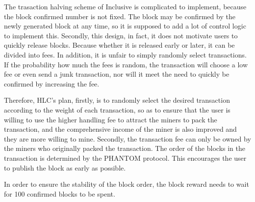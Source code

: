\documentclass[a4paper,11pt]{article}
\begin{document}
The trasaction halving scheme of Inclusive is complicated to implement, because the block confirmed number is not fixed. The block may be confirmed by the newly generated block at any time, so it is supposed to add a lot of control logic to implement this. Secondly, this design, in fact, it does not motivate users to quickly release blocks. Because whether it is released early or later, it can be divided into fees. In addition, it is unfair to simply randomly select transactions. If the probability how much the fees is random, the transaction will choose a low fee or even send a junk transaction, nor will it meet the need to quickly be confirmed by increasing the fee.

Therefore, HLC's plan, firstly, is to randomly select the desired transaction according to the weight of each transaction, so as to ensure that the user is willing to use the higher handling fee to attract the miners to pack the transaction, and the comprehensive income of the miner is also improved and they are more willing to mine. Secondly, the transaction fee can only be owned by the miners who originally packed the transaction. The order of the blocks in the transaction is determined by the PHANTOM protocol. This encourages the user to publish the block as early as possible.

In order to ensure the stability of the block order, the block reward needs to wait for 100 confirmed blocks to be spent.







\clearpage



%
%


\end{document}
